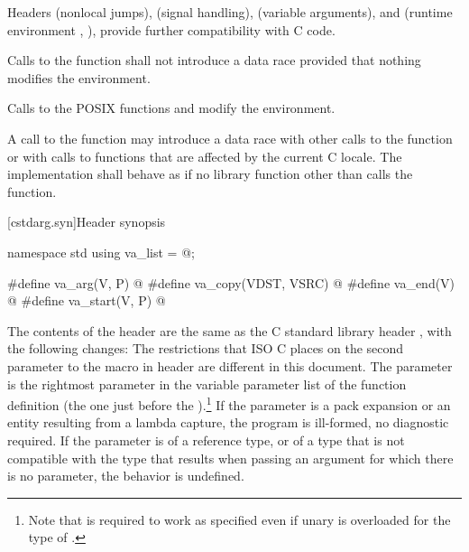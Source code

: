 \pnum
{}%
%
%
%
%
%
%
Headers
 (nonlocal jumps),
 (signal handling),
 (variable arguments),
and
 (runtime environment , ),
provide further compatibility with C code.

\pnum
Calls to the function
%
 shall not introduce a data
race provided that nothing modifies the environment.
\begin{note} Calls to the POSIX functions
%
 and
%
 modify the
environment. \end{note}

\pnum
A call to the  function
may introduce a data race with other
calls to the  function or with calls to functions that are
affected by the current C locale. The implementation shall behave as if no
library function other than  calls the 
function.

[cstdarg.syn]{Header  synopsis}

%
%
%
%
%
%
\begin{codeblock}
namespace std {
  using va_list = @\seebelow@;
}

#define va_arg(V, P) @\seebelow@
#define va_copy(VDST, VSRC) @\seebelow@
#define va_end(V) @\seebelow@
#define va_start(V, P) @\seebelow@
\end{codeblock}

\pnum
{}%
The contents of the header  are the same as the C
standard library header , with the following changes:
The restrictions that ISO C places on the second parameter to the
%
macro in header
%
are different in this document.
The parameter
is the rightmost parameter in the variable parameter list
of the function definition (the one just before the
).\footnote{Note that
is required to work as specified even if unary
is overloaded for the type of
.}
If the parameter  is a pack expansion or
an entity resulting from a lambda capture,
the program is ill-formed, no diagnostic required.
If the parameter
is of a reference type, or of a type that is not compatible with the
type that results when passing an argument for which there is no
parameter, the behavior is undefined.

